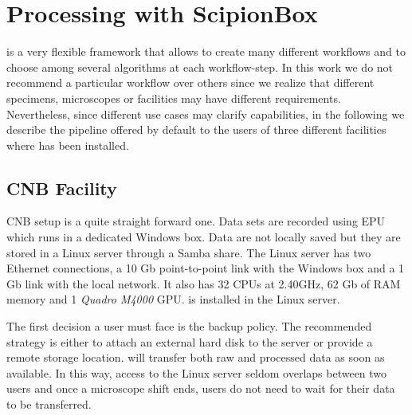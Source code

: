 \section{Processing with ScipionBox}


\scipionbox is a very flexible framework that allows to create many different workflows and to choose among several algorithms at each workflow-step. In this work we do not recommend a particular workflow 
over others since we realize that different specimens, microscopes or facilities may have different requirements. Nevertheless, since different use cases may clarify \scipionbox capabilities, in the following we describe the pipeline offered by default to the users of three different facilities where \scipionbox has been installed.

\subsection{CNB Facility}

CNB setup is a quite straight forward one. Data sets are recorded using EPU which runs in a dedicated Windows box. Data are not locally saved but they are stored in a Linux server through a Samba share. The Linux server has two Ethernet connections, a 10 Gb point-to-point link with the Windows box and a 1 Gb link with the local network. It also has 32 CPUs at 2.40GHz, 62 Gb of RAM memory and 1 \textit{Quadro M4000} GPU. \scipionbox is installed in the Linux server. 

The first decision a user must face is the backup policy. The recommended strategy is either to attach an external hard disk to the server or provide a remote storage location. \scipionbox will transfer both raw and processed data as soon as available. In this way, access to the Linux server seldom overlaps between two users and once a microscope shift ends, users do not need to wait for their data to be transferred. 

